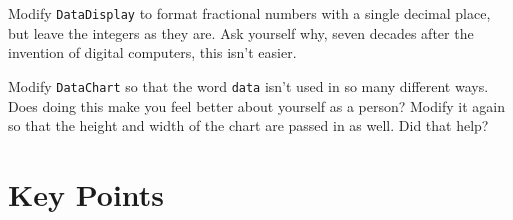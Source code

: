 
Modify \texttt{DataDisplay} to format fractional numbers with a single decimal place,
but leave the integers as they are.
Ask yourself why,
seven decades after the invention of digital computers,
this isn't easier.


Modify \texttt{DataChart} so that the word \texttt{data} isn't used in so many different ways.
Does doing this make you feel better about yourself as a person?
Modify it again so that the height and width of the chart are passed in as well.
Did that help?

\section*{Key Points}



